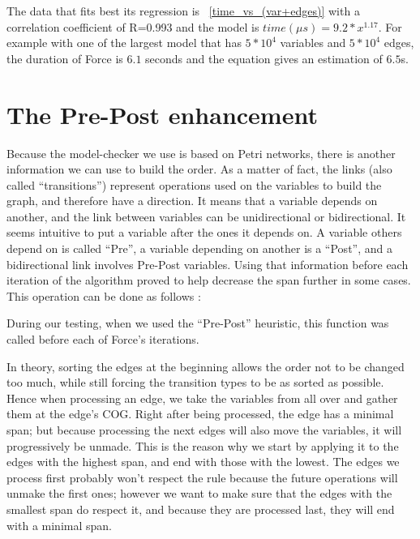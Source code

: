 \documentclass[12pt]{report}
\begin{document}
The data that fits best its regression is ~\ref{time_vs_(var+edges)} with a correlation coefficient of R=0.993 and the model is $time({\mu}s)= {9.2}*x^{1.17}$. For example with one of the largest model that has $5*10^4$ variables and $5*10^4$ edges, the duration of Force is $6.1$ seconds and the equation gives an estimation of $6.5$s.

\newpage
\section{The Pre-Post enhancement} \label{sec:pre_post}

Because the model-checker we use is based on Petri networks, there is another information we can use to build the order. As a matter of fact, the links (also called \enquote{transitions}) represent operations used on the variables to build the graph, and therefore have a direction. It means that a variable depends on another, and the link between variables can be unidirectional or bidirectional. It seems intuitive to put a variable after the ones it depends on. A variable others depend on is called \enquote{Pre}, a variable depending on another is a \enquote{Post}, and a bidirectional link involves Pre-Post variables. Using that information before each iteration of the algorithm proved to help decrease the span further in some cases.
This operation can be done as follows :

\begin{algorithm}
\begin{algorithmic}[1]
  \EndFor
\EndFunction
\label{order-pre-post}
\end{algorithmic}
\end{algorithm}

During our testing, when we used the \enquote{Pre-Post} heuristic, this function was called before each of Force's iterations.

In theory, sorting the edges at the beginning allows the order not to be changed too much, while still forcing the transition types to be as sorted as possible. Hence when processing an edge, we take the variables from all over and gather them at the edge's COG. Right after being processed, the edge has a minimal span; but because processing the next edges will also move the variables, it will progressively be unmade. This is the reason why we start by applying it to the edges with the highest span, and end with those with the lowest. The edges we process first probably won't respect the rule because the future operations will unmake the first ones; however we want to make sure that the edges with the smallest span do respect it, and because they are processed last, they will end with a minimal span.
\end{document}
